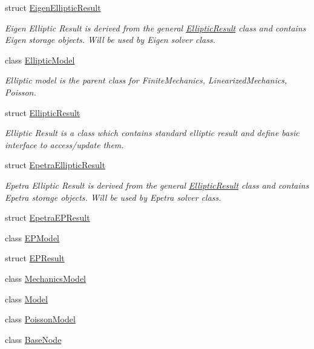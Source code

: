 \begin{DoxyCompactItemize}
struct \hyperlink{structvoom_1_1_eigen_elliptic_result}{EigenEllipticResult}
\begin{DoxyCompactList}\small\item\em Eigen Elliptic Result is derived from the general \hyperlink{structvoom_1_1_elliptic_result}{EllipticResult} class and contains Eigen storage objects. Will be used by Eigen solver class. \item\end{DoxyCompactList}\item 
class \hyperlink{classvoom_1_1_elliptic_model}{EllipticModel}
\begin{DoxyCompactList}\small\item\em Elliptic model is the parent class for FiniteMechanics, LinearizedMechanics, Poisson. \item\end{DoxyCompactList}\item 
struct \hyperlink{structvoom_1_1_elliptic_result}{EllipticResult}
\begin{DoxyCompactList}\small\item\em Elliptic Result is a class which contains standard elliptic result and define basic interface to access/update them. \item\end{DoxyCompactList}\item 
struct \hyperlink{structvoom_1_1_epetra_elliptic_result}{EpetraEllipticResult}
\begin{DoxyCompactList}\small\item\em Epetra Elliptic Result is derived from the general \hyperlink{structvoom_1_1_elliptic_result}{EllipticResult} class and contains Epetra storage objects. Will be used by Epetra solver class. \item\end{DoxyCompactList}\item 
struct \hyperlink{structvoom_1_1_epetra_e_p_result}{EpetraEPResult}
\item 
class \hyperlink{classvoom_1_1_e_p_model}{EPModel}
\item 
struct \hyperlink{structvoom_1_1_e_p_result}{EPResult}
\item 
class \hyperlink{classvoom_1_1_mechanics_model}{MechanicsModel}
\item 
class \hyperlink{classvoom_1_1_model}{Model}
\item 
class \hyperlink{classvoom_1_1_poisson_model}{PoissonModel}
\item 
class \hyperlink{classvoom_1_1_base_node}{BaseNode}

\end{DoxyCompactItemize}
